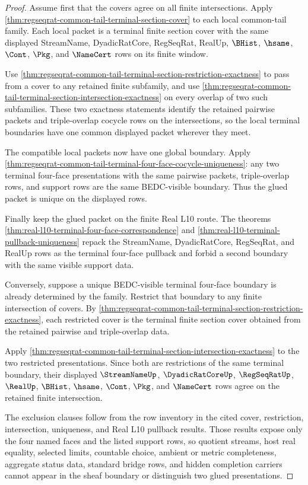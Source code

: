 \begin{proof}
Assume first that the covers agree on all finite intersections. Apply \autoref{thm:regseqrat-common-tail-terminal-section-cover} to each local common-tail family. Each local packet is a terminal finite section cover with the same displayed StreamName, DyadicRatCore, RegSeqRat, RealUp, $\BHist$, $\hsame$, $\Cont$, $\Pkg$, and $\NameCert$ rows on its finite window.

Use \autoref{thm:regseqrat-common-tail-terminal-section-restriction-exactness} to pass from a cover to any retained finite subfamily, and use \autoref{thm:regseqrat-common-tail-terminal-section-intersection-exactness} on every overlap of two such subfamilies. These two exactness statements identify the retained pairwise packets and triple-overlap cocycle rows on the intersections, so the local terminal boundaries have one common displayed packet wherever they meet.

The compatible local packets now have one global boundary. Apply \autoref{thm:regseqrat-common-tail-terminal-four-face-cocycle-uniqueness}: any two terminal four-face presentations with the same pairwise packets, triple-overlap rows, and support rows are the same BEDC-visible boundary. Thus the glued packet is unique on the displayed rows.

Finally keep the glued packet on the finite Real L10 route. The theorems \autoref{thm:real-l10-terminal-four-face-correspondence} and \autoref{thm:real-l10-terminal-pullback-uniqueness} repack the StreamName, DyadicRatCore, RegSeqRat, and RealUp rows as the terminal four-face pullback and forbid a second boundary with the same visible support data.

Conversely, suppose a unique BEDC-visible terminal four-face boundary is already determined by the family. Restrict that boundary to any finite intersection of covers. By \autoref{thm:regseqrat-common-tail-terminal-section-restriction-exactness}, each restricted cover is the terminal finite section cover obtained from the retained pairwise and triple-overlap data.

Apply \autoref{thm:regseqrat-common-tail-terminal-section-intersection-exactness} to the two restricted presentations. Since both are restrictions of the same terminal boundary, their displayed $\StreamNameUp$, $\DyadicRatCoreUp$, $\RegSeqRatUp$, $\RealUp$, $\BHist$, $\hsame$, $\Cont$, $\Pkg$, and $\NameCert$ rows agree on the retained finite intersection.

The exclusion clauses follow from the row inventory in the cited cover, restriction, intersection, uniqueness, and Real L10 pullback results. Those results expose only the four named faces and the listed support rows, so quotient streams, host real equality, selected limits, countable choice, ambient or metric completeness, aggregate status data, standard bridge rows, and hidden completion carriers cannot appear in the sheaf boundary or distinguish two glued presentations.
\end{proof}

